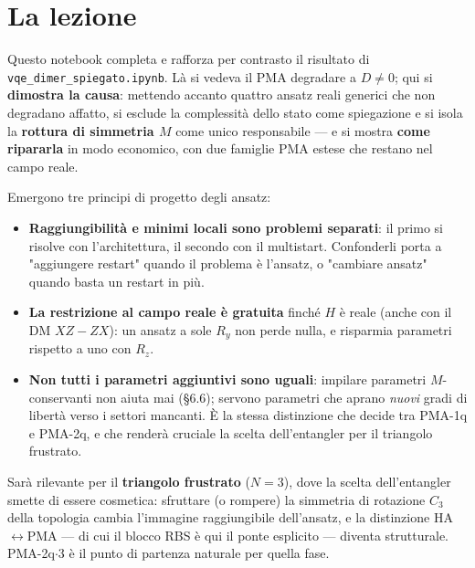 \documentclass[11pt,a4paper]{article}
\begin{document}
\section{La lezione}

Questo notebook completa e rafforza per contrasto il risultato di
\texttt{vqe\_dimer\_spiegato.ipynb}. Là si vedeva il PMA degradare a
$D\neq0$; qui si \textbf{dimostra la causa}: mettendo accanto quattro
ansatz reali generici che non degradano affatto, si esclude la
complessità dello stato come spiegazione e si isola la \textbf{rottura
di simmetria $M$} come unico responsabile --- e si mostra \textbf{come
ripararla} in modo economico, con due famiglie PMA estese che restano
nel campo reale.

Emergono tre principi di progetto degli ansatz:
\begin{itemize}[leftmargin=1.3em,itemsep=0.25em]
\item \textbf{Raggiungibilità e minimi locali sono problemi separati}:
il primo si risolve con l'architettura, il secondo con il multistart.
Confonderli porta a "aggiungere restart" quando il problema è l'ansatz,
o "cambiare ansatz" quando basta un restart in più.
\item \textbf{La restrizione al campo reale è gratuita} finché $H$ è
reale (anche con il DM $XZ-ZX$): un ansatz a sole $R_y$ non perde
nulla, e risparmia parametri rispetto a uno con $R_z$.
\item \textbf{Non tutti i parametri aggiuntivi sono uguali}: impilare
parametri $M$-conservanti non aiuta mai (\S 6.6); servono parametri che
aprano \emph{nuovi} gradi di libertà verso i settori mancanti. È la
stessa distinzione che decide tra PMA-1q e PMA-2q, e che renderà
cruciale la scelta dell'entangler per il triangolo frustrato.
\end{itemize}

Sarà rilevante per il \textbf{triangolo frustrato} ($N=3$), dove la
scelta dell'entangler smette di essere cosmetica: sfruttare (o rompere)
la simmetria di rotazione $C_3$ della topologia cambia l'immagine
raggiungibile dell'ansatz, e la distinzione HA$\leftrightarrow$PMA ---
di cui il blocco RBS è qui il ponte esplicito --- diventa strutturale.
PMA-2q$\cdot$3 è il punto di partenza naturale per quella fase.
\end{document}
